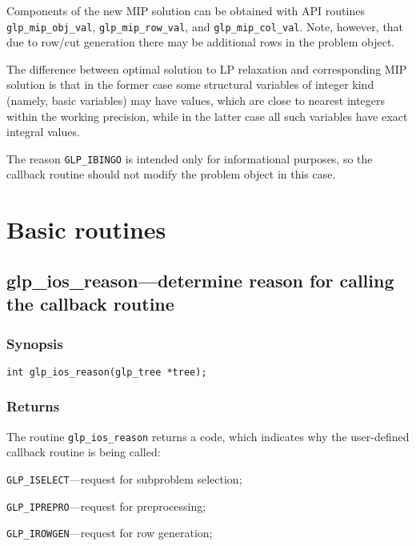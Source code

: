 Components of the new MIP solution can be obtained with API routines
\verb|glp_mip_obj_val|, \verb|glp_mip_row_val|, and
\verb|glp_mip_col_val|. Note, however, that due to row/cut generation
there may be additional rows in the problem object.

The difference between optimal solution to LP relaxation and
corresponding MIP solution is that in the former case some structural
variables of integer kind (namely, basic variables) may have values,
which are close to nearest integers within the working precision, while
in the latter case all such variables have exact integral values.

The reason \verb|GLP_IBINGO| is intended only for informational
purposes, so the callback routine should not modify the problem object
in this case.


\newpage

\section{Basic routines}

\subsection{glp\_ios\_reason---determine reason for calling the
callback routine}

\subsubsection*{Synopsis}

\begin{verbatim}
int glp_ios_reason(glp_tree *tree);
\end{verbatim}

\subsubsection*{Returns}

The routine \verb|glp_ios_reason| returns a code, which indicates why
the user-defined callback routine is being called:

\verb|GLP_ISELECT|---request for subproblem selection;

\verb|GLP_IPREPRO|---request for preprocessing;

\verb|GLP_IROWGEN|---request for row generation;

